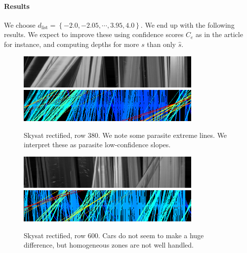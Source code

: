 \documentclass{article}
\def\epiWidth{0.8}
\theoremstyle{definition}
\begin{document}
\paragraph{Results} We choose $d_\text{list} = \left\{-2.0, -2.05, \cdots, 3.95, 4.0\right\}$. We end up with the following results. We expect to improve these using confidence scores $C_e$ as in the article for instance, and computing depths for more $s$ than only $\widehat{s}$.


\begin{figure}[ht]
  \centering
  \includegraphics[width=\epiWidth\textwidth]{images/1520204861279_epi.png}\\
  \includegraphics[width=\epiWidth\textwidth]{images/1520204861279_epi_colored.png}
  \caption{Skysat rectified, row 380. We note some parasite extreme lines. We interpret these as parasite low-confidence slopes.}
\end{figure}


\begin{figure}[ht]
  \centering
  \includegraphics[width=\epiWidth\textwidth]{images/1520205010590_epi.png}\\
  \includegraphics[width=\epiWidth\textwidth]{images/1520205010590_epi_colored.png}
  \caption{Skysat rectified, row 600. Cars do not seem to make a huge difference, but homogeneous zones are not well handled.}
\end{figure}
\end{document}
